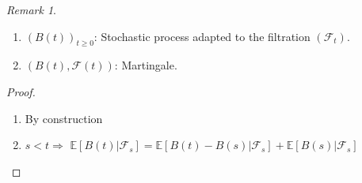 \documentclass[12pt]{report}
\newcommand{\F}{\mathcal{F}}
\newcommand{\E}{\mathbb{E}}
\renewcommand{\1}{\mathbb{1}}
\theoremstyle{break}
\theoremstyle{newdef}
\theoremstyle{remark}
\newtheorem*{rem}{Remark} %
\begin{document}
\begin{rem}
\leavevmode
\begin{enumerate}
\item $(B(t))_{t\geq0}$: Stochastic process adapted to the filtration $(\F_t)$.
\item $(B(t), \F(t))$: Martingale.
\end{enumerate}

\begin{proof}
\begin{enumerate}
\item By construction
\item $s < t \Rightarrow$
$\E[B(t)|\F_s] = \E[B(t)-B(s)|\F_s] + \E[B(s)|\F_s]$
\end{enumerate}
\end{proof}
\end{rem}
















\end{document}
